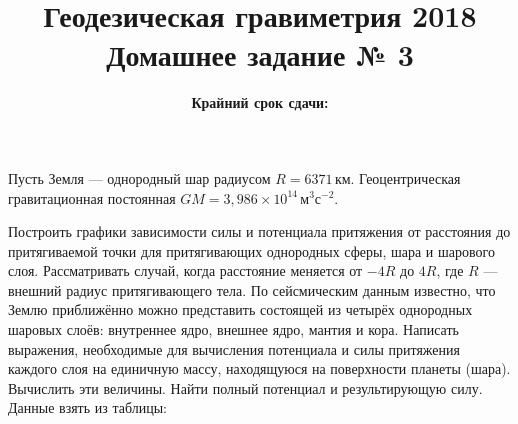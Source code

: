 \documentclass[11pt, a4paper,addpoints]{exam}
\title{{\Large Геодезическая гравиметрия 2018}\\ 
    {\bf\Large Домашнее задание № 3}}
\author{}
\date{\normalsize\bf Крайний срок сдачи: \DTMusedate{deadline}}
\theoremstyle{remark}
\begin{document}
\maketitle
\thispagestyle{empty}
\begin{questions}
    \question[1] Пусть Земля --- однородный шар радиусом $R = 6371\,\text{км}$. Геоцентрическая
    гравитационная постоянная $GM = 3,986\times10^{14}\,\text{м}^3\text{с}^{-2}$.
    \question[2] Построить графики зависимости силы и потенциала притяжения от расстояния до
    притягиваемой точки для притягивающих однородных сферы, шара и шарового слоя. Рассматривать
    случай, когда расстояние меняется от $-4R$ до $4R$, где $R$ --- внешний радиус притягивающего
    тела.
    \question[2] По сейсмическим данным известно, что Землю приближённо можно представить состоящей 
    из четырёх однородных шаровых слоёв: внутреннее ядро, внешнее ядро, мантия и кора. 
    Написать выражения, необходимые для 
    вычисления потенциала и силы притяжения каждого слоя на единичную массу, находящуюся на поверхности 
    планеты (шара). Вычислить эти величины. Найти полный потенциал и результирующую силу.
    Данные взять из таблицы:
    \begin{table}[h]

\end{table}
\end{questions}
\end{document}
